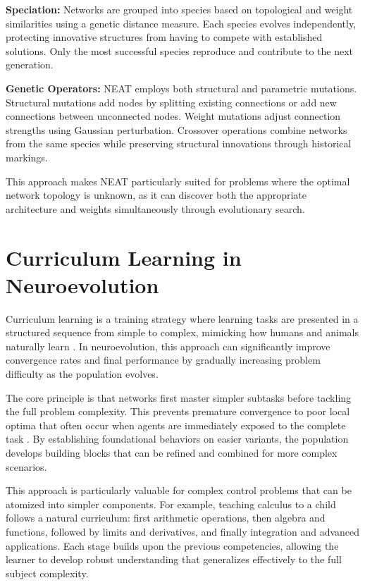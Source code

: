\textbf{Speciation:} Networks are grouped into species based on topological and weight similarities using a genetic distance measure. Each species evolves independently, protecting innovative structures from having to compete with established solutions. Only the most successful species reproduce and contribute to the next generation.

\textbf{Genetic Operators:} NEAT employs both structural and parametric mutations. Structural mutations add nodes by splitting existing connections or add new connections between unconnected nodes. Weight mutations adjust connection strengths using Gaussian perturbation. Crossover operations combine networks from the same species while preserving structural innovations through historical markings.

This approach makes NEAT particularly suited for problems where the optimal network topology is unknown, as it can discover both the appropriate architecture and weights simultaneously through evolutionary search.

\section{Curriculum Learning in Neuroevolution}

Curriculum learning is a training strategy where learning tasks are presented in a structured sequence from simple to complex, mimicking how humans and animals naturally learn \parencite{bengio2009curriculum}. In neuroevolution, this approach can significantly improve convergence rates and final performance by gradually increasing problem difficulty as the population evolves.

The core principle is that networks first master simpler subtasks before tackling the full problem complexity. This prevents premature convergence to poor local optima that often occur when agents are immediately exposed to the complete task \parencite{elman1993learning}. By establishing foundational behaviors on easier variants, the population develops building blocks that can be refined and combined for more complex scenarios.

This approach is particularly valuable for complex control problems that can be atomized into simpler components. For example, teaching calculus to a child follows a natural curriculum: first arithmetic operations, then algebra and functions, followed by limits and derivatives, and finally integration and advanced applications. Each stage builds upon the previous competencies, allowing the learner to develop robust understanding that generalizes effectively to the full subject complexity.


